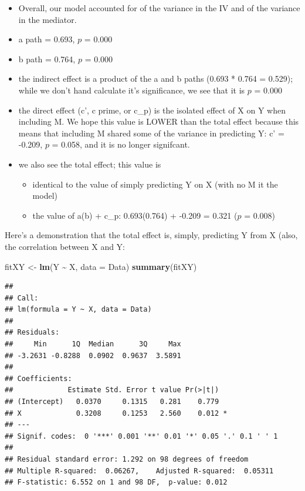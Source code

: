 \documentclass[
  11pt,
]{book}
\newenvironment{Shaded}{\begin{snugshade}}{\end{snugshade}}
\newcommand{\AttributeTok}[1]{\textcolor[rgb]{0.27,0.27,0.27}{#1}}
\newcommand{\FunctionTok}[1]{\textcolor[rgb]{0.27,0.27,0.27}{\textbf{#1}}}
\newcommand{\NormalTok}[1]{#1}
\newcommand{\OtherTok}[1]{\textcolor[rgb]{0.37,0.37,0.37}{#1}}
\newcommand{\SpecialCharTok}[1]{\textcolor[rgb]{0.43,0.43,0.43}{\textbf{#1}}}
\providecommand{\tightlist}{%
  \setlength{\itemsep}{0pt}\setlength{\parskip}{0pt}}
\begin{document}
\begin{itemize}
\tightlist
\item
  Overall, our model accounted for of the variance in the IV and of the variance in the mediator.
\item
  a path = 0.693, \(p\) = 0.000
\item
  b path = 0.764, \(p\) = 0.000
\item
  the indirect effect is a product of the a and b paths (0.693 * 0.764 = 0.529); while we don't hand calculate it's significance, we see that it is \(p\) = 0.000
\item
  the direct effect (c', c prime, or c\_p) is the isolated effect of X on Y when including M. We hope this value is LOWER than the total effect because this means that including M shared some of the variance in predicting Y: c' = -0.209, \(p\) = 0.058, and it is no longer signifcant.
\item
  we also see the total effect; this value is

  \begin{itemize}
  \tightlist
  \item
    identical to the value of simply predicting Y on X (with no M it the model)
  \item
    the value of a(b) + c\_p: 0.693(0.764) + -0.209 = 0.321 (\(p\) = 0.008)
  \end{itemize}
\end{itemize}

Here's a demonstration that the total effect is, simply, predicting Y from X (also, the correlation between X and Y:

\begin{Shaded}
\begin{Highlighting}[]
\NormalTok{fitXY }\OtherTok{\textless{}{-}} \FunctionTok{lm}\NormalTok{(Y }\SpecialCharTok{\textasciitilde{}}\NormalTok{ X, }\AttributeTok{data =}\NormalTok{ Data)}
\FunctionTok{summary}\NormalTok{(fitXY)}
\end{Highlighting}
\end{Shaded}

\begin{verbatim}
## 
## Call:
## lm(formula = Y ~ X, data = Data)
## 
## Residuals:
##     Min      1Q  Median      3Q     Max 
## -3.2631 -0.8288  0.0902  0.9637  3.5891 
## 
## Coefficients:
##             Estimate Std. Error t value Pr(>|t|)  
## (Intercept)   0.0370     0.1315   0.281    0.779  
## X             0.3208     0.1253   2.560    0.012 *
## ---
## Signif. codes:  0 '***' 0.001 '**' 0.01 '*' 0.05 '.' 0.1 ' ' 1
## 
## Residual standard error: 1.292 on 98 degrees of freedom
## Multiple R-squared:  0.06267,    Adjusted R-squared:  0.05311 
## F-statistic: 6.552 on 1 and 98 DF,  p-value: 0.012
\end{verbatim}
\end{document}
